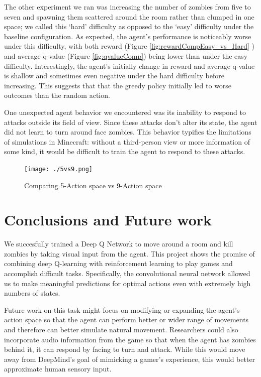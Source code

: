 \documentclass{article}
\begin{document}
\begin{multicols}{2}
The other experiment we ran was increasing the number of zombies from five to seven and spawning them scattered around the room rather than clumped in one space; we called this `hard' difficulty as opposed to the `easy' difficulty under the baseline configuration.
As expected, the agent's performance is noticeably worse under this difficulty, with both reward (Figure \ref{fig:rewardCompEasy_vs_Hard} ) and average q-value (Figure \ref{fig:qvalueComp}) being lower than under the easy difficulty.
Interestingly, the agent's initially change in reward and average q-value is shallow and sometimes even negative under the hard difficulty before increasing.
This suggests that that the greedy policy initially led to worse outcomes than the random action.

One unexpected agent behavior we encountered was its inability to respond to attacks outside its field of view. Since these attacks don't alter its state, the agent did not learn to turn around face zombies.
This behavior typifies the limitations of simulations in Minecraft: without a third-person view or more information of some kind, it would be difficult to train the agent to respond to these attacks.

\begin{figure}[H]
\caption{Comparing 5-Action space vs 9-Action space}
\centering
\texttt{[image: ./5vs9.png]}
\label{fig:rewardComp5vs9}
\end{figure}

\section{Conclusions and Future work}

We succesfully trained a Deep Q Network to move around a room and kill zombies by taking visual input from the agent.
This project shows the promise of combining deep Q-learning with reinforcement learning to play games and accomplish difficult tasks.
Specifically, the convolutional neural network allowed us to make meaningful predictions for optimal actions even with extremely high numbers of states.

Future work on this task might focus on modifying or expanding the agent's action space so that the agent can perform better or wider range of movements and therefore can better simulate natural movement.
Researchers could also incorporate audio information from the game so that when the agent has zombies behind it, it can respond by facing to turn and attack.
While this would move away from DeepMind's goal of mimicking a gamer's experience, this would better approximate human sensory input.



\end{multicols}
\end{document}

